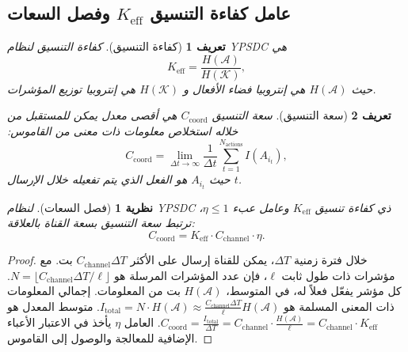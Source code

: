 \documentclass[11pt,a4paper]{article}
\newtheorem{definition}{تعريف}
\newtheorem{theorem}{نظرية}
\begin{document}
	\subsection{عامل كفاءة التنسيق \(K_{\mathrm{eff}}\) وفصل السعات}
	
	\begin{definition}[كفاءة التنسيق]
		\emph{كفاءة التنسيق} لنظام YPSDC هي
		\begin{equation}
			K_{\mathrm{eff}} = \frac{H(\mathcal{A})}{H(\mathcal{K})},
			\label{eq:Kdef}
		\end{equation}
		حيث \(H(\mathcal{A})\) هي إنتروبيا فضاء الأفعال و \(H(\mathcal{K})\) هي إنتروبيا توزيع المؤشرات.
	\end{definition}
	
	\begin{definition}[سعة التنسيق]
		\emph{سعة التنسيق} \(C_{\mathrm{coord}}\) هي أقصى معدل يمكن للمستقبل من خلاله استخلاص معلومات ذات معنى من القاموس:
		\begin{equation}
			C_{\mathrm{coord}} = \lim_{\Delta t \to \infty} \frac{1}{\Delta t} \sum_{t=1}^{N_{\mathrm{actions}}} I(A_{i_t}),
		\end{equation}
		حيث \(A_{i_t}\) هو الفعل الذي يتم تفعيله خلال الإرسال $t$.
	\end{definition}
	
	\begin{theorem}[فصل السعات]
		\label{thm:capacity-separation}
		لنظام YPSDC ذي كفاءة تنسيق \(K_{\mathrm{eff}}\) وعامل عبء \(\eta \le 1\)، ترتبط سعة التنسيق بسعة القناة بالعلاقة:
		\begin{equation}
			\boxed{C_{\mathrm{coord}} = K_{\mathrm{eff}} \cdot C_{\mathrm{channel}} \cdot \eta}.
			\label{eq:capacity-separation}
		\end{equation}
	\end{theorem}
	
	\begin{proof}
		خلال فترة زمنية \(\Delta T\)، يمكن للقناة إرسال على الأكثر \(C_{\mathrm{channel}} \Delta T\) بت. مع مؤشرات ذات طول ثابت \(\ell\)، فإن عدد المؤشرات المرسلة هو \(N = \lfloor C_{\mathrm{channel}} \Delta T / \ell \rfloor\). كل مؤشر يفعّل فعلاً له، في المتوسط، \(H(\mathcal{A})\) بت من المعلومات. إجمالي المعلومات ذات المعنى المسلمة هو \(I_{\mathrm{total}} = N \cdot H(\mathcal{A}) \approx \frac{C_{\mathrm{channel}} \Delta T}{\ell} H(\mathcal{A})\). متوسط المعدل هو \(C_{\mathrm{coord}} = \frac{I_{\mathrm{total}}}{\Delta T} = C_{\mathrm{channel}} \cdot \frac{H(\mathcal{A})}{\ell} = C_{\mathrm{channel}} \cdot K_{\mathrm{eff}}\). العامل \(\eta\) يأخذ في الاعتبار الأعباء الإضافية للمعالجة والوصول إلى القاموس.
	\end{proof}
	
\end{document}
